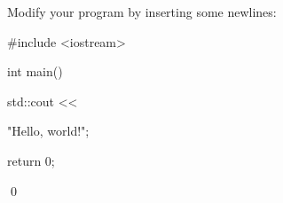 Modify your program by inserting some newlines:
\begin{console}
#include <iostream>

int main()
{
    std::cout << 




            "Hello, world!\n";

    return 0;
}
\end{console}
\qed
